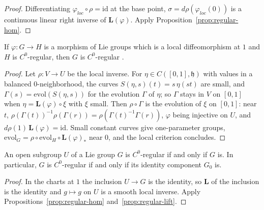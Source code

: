 \begin{proof}
  \leanok
  Differentiating $\varphi_{loc}\circ\rho = \mathrm{id}$ at the base point,
  $\sigma = d\rho(\varphi_{loc}(0))$ is a continuous linear right inverse of $\mathbf{L}(\varphi)$.
  Apply Proposition~\ref{prop:regular-hom}.
\end{proof}

\begin{proposition}
  \label{prop:regular-lift}
  \leanok
  If $\varphi\colon G \to H$ is a morphism of Lie groups which is a local diffeomorphism at $1$
  and $H$ is $C^0$-regular, then $G$ is $C^0$-regular \cite[Proposition 6.1.5]{GN26}.
\end{proposition}

\begin{proof}
  \leanok
  Let $\rho\colon V \to U$ be the local inverse. For $\eta \in C([0, 1], \mathfrak h)$ with
  values in a balanced $0$-neighborhood, the curves $S(\eta, s)(t) = s\,\eta(st)$ are small, and
  $\Gamma(s) = \mathrm{evol}(S(\eta, s))$ for the evolution $\Gamma$ of $\eta$; so $\Gamma$ stays in
  $V$ on $[0, 1]$ when $\eta = \mathbf{L}(\varphi)\circ\xi$ with $\xi$ small. Then $\rho\circ\Gamma$
  is the evolution of $\xi$ on $[0, 1]$: near $t$,
  $\rho(\Gamma(t))^{-1}\rho(\Gamma(r)) = \rho(\Gamma(t)^{-1}\Gamma(r))$, $\varphi$ being injective
  on $U$, and $d\rho(1)\,\mathbf{L}(\varphi) = \mathrm{id}$. Small constant curves give
  one-parameter groups, $\mathrm{evol}_G = \rho\circ\mathrm{evol}_H\circ\mathbf{L}(\varphi)_*$ near $0$,
  and the local criterion concludes.
\end{proof}

\begin{corollary}
  \label{cor:regular-open-subgroup}
  \leanok
  An open subgroup $U$ of a Lie group $G$ is $C^0$-regular if and only if $G$ is. In particular,
  $G$ is $C^0$-regular if and only if its identity component $G_0$ is.
\end{corollary}

\begin{proof}
  \leanok
  In the charts at $1$ the inclusion $U \to G$ is the identity, so $\mathbf{L}$ of the inclusion is
  the identity and $g \mapsto g$ on $U$ is a smooth local inverse. Apply
  Propositions~\ref{prop:regular-hom} and~\ref{prop:regular-lift}.
\end{proof}

